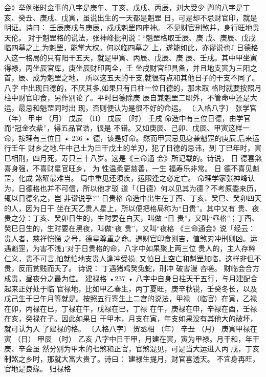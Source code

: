 会》举例张时佥事的八字是庚午、丁亥、戊戌、丙辰，刘大受少
卿的八字是丁亥、癸丑、庚戌、戊寅，虽说出生的一天都是魁罡
日，可是却不忌财官印，就是明证。诗曰：
壬辰庚戌与庚辰，戍戌魁罡四座神。
不见财官刑煞并，身行旺地贵天伦。
对于魁罡格的说法，张神峰批判说：“魁罡格取壬辰、庚
戊、庚辰、戊戌临四墓之上,为魁罡，能掌大权。何以临四墓之
上，遂能如此，亦谬说也J
日德格
入这一格局的只有阳干五天，就是甲寅、丙辰、戊辰、庚
辰、壬戌。其中甲坐寅得禄，丙坐辰官库，庚坐辰财印两全，壬
坐戌财官印具备，并且地支寅为三阳之首，辰、成为魁罡之地，
所以这五天的干支,就很有点和其他日子的干支不同了。八字
中出现日德的，不厌其多,如果只有日柱一位日德的，那未取
格时就要按照月柱中财官印食，另作别论了。平时日德除庚
辰自兼魁罡二职外，不管命中还是大运，最忌和魁罡同时出
现，否则便认为是很不好的命运。
（:入格八字〕 张学官
（年） 甲申
（月） 戊辰
（H） 戊辰
（时） 壬戌
命造中有三位日德，由学官而“冠金衣紫”，得五品官诰，很是
不错。又如庚辰、己卯、戊辰、甲寅这样一命，按理有三位日
• 236 •
德，该是好命。然而甲寅忌见身兼魁罡的庚辰,后来运行壬午
财乡之地,午中己土为日干戊土的羊刃，犯了日德的忌讳，到
丁巳年时，寅巳相刑，四月死，寿只三十八岁。这是《三命通
会》所记载的。诗说，
日 德喜煞喜身强，不喜财星官旺乡，
为 性温柔更慈善，一生 福寿乐非常。
日 德不喜见魁罡，化成 煞曜最难当。
局中重见还须疾，运限逢之必定亡。
命理学家张神峰认为，日德格也并不可信，所以他才驳
道「（日德）何以见其为德？不考原委来历，辄以日德名之，岂
非谬说乎?”
日贵格
命造中出生在丁酉、丁亥、癸巳、癸卯四天的人，因为日干
坐在天乙贵人星上，所以便把格局称为“日贵”。其中又有
贵、夜贵之分：丁亥、癸卯日生的，生时要在白天，叫做 “日
贵”，又叫“昼格”；丁酉、癸巳日生的，生时要在黑夜，叫做“夜
贵”，又叫“夜格 《三命通会》说「经云：贵人者，慈祥恺悌
之号，德星尊重之命。遇财官印食则吉，值煞刃冲刑则凶。运
遇魁罡，为害不浅」'对于日贵格的命，八字中如果聚上两三位
贵人的，主人存粹仁义，贵不可言,怕就怕地支贵人逢冲受损,
又怕日上空亡和魁罡加临，这样非但不贵，反而贫贱而夭了。
诗说：
丁遇猪鸡癸兔蛇，刑冲 破害漫 咨嗟。
财临会合方成贵，昼夜分之最为佳。
建禄格
•237 •
八字中自身日柱天干五行，与月建配合起来正好处于临
官禄地，比如甲乙春生，丙丁夏旺，庚辛秋锐，壬癸冬长，以及
戊己生于巳午月等就是。按照五行寄生上二宫的说法，甲禄
（临官）在寅，乙禄在卯，丙禄在巳，丁禄在午，戊禄在巳，丁禄
在午，庚禄在申，辛禄在酉，壬禄在亥，癸禄在子。因此如果日
干甲木，月支在寅，年支如果没有其他大的破坏，就可认为入
了建禄的格。
〔入格八字〕 贺丞相
（年） 辛丑
（月） 庚寅甲禄在寅
（日） 甲辰
（时） 乙亥
八字中日干甲，月建在寅，寅为甲禄。月干和，年干庚、辛金虽
然分别为甲木的七煞和正官，官煞混见，可是当大运进入丙
戌，丁亥制煞之乡时，那就大富大贵了。诗曰：
建禄生提月，财官喜透天。
不宜身再旺，官地是良缘。
归禄格
